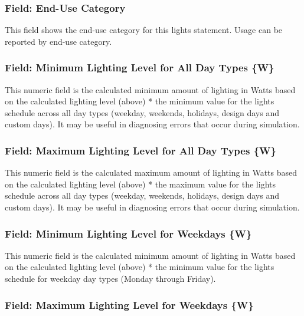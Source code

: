 \subsubsection{Field: End-Use Category}\label{field-end-use-category}

This field shows the end-use category for this lights statement. Usage can be reported by end-use category.

\subsubsection{Field: Minimum Lighting Level for All Day Types \{W\}}\label{field-minimum-lighting-level-for-all-day-types-w}

This numeric field is the calculated minimum amount of lighting in Watts based on the calculated lighting level (above) * the minimum value for the lights schedule across all day types (weekday, weekends, holidays, design days and custom days). It may be useful in diagnosing errors that occur during simulation.

\subsubsection{Field: Maximum Lighting Level for All Day Types \{W\}}\label{field-maximum-lighting-level-for-all-day-types-w}

This numeric field is the calculated maximum amount of lighting in Watts based on the calculated lighting level (above) * the maximum value for the lights schedule across all day types (weekday, weekends, holidays, design days and custom days). It may be useful in diagnosing errors that occur during simulation.

\subsubsection{Field: Minimum Lighting Level for Weekdays \{W\}}\label{field-minimum-lighting-level-for-weekdays-w}

This numeric field is the calculated minimum amount of lighting in Watts based on the calculated lighting level (above) * the minimum value for the lights schedule for weekday day types (Monday through Friday).

\subsubsection{Field: Maximum Lighting Level for Weekdays \{W\}}\label{field-maximum-lighting-level-for-weekdays-w}

